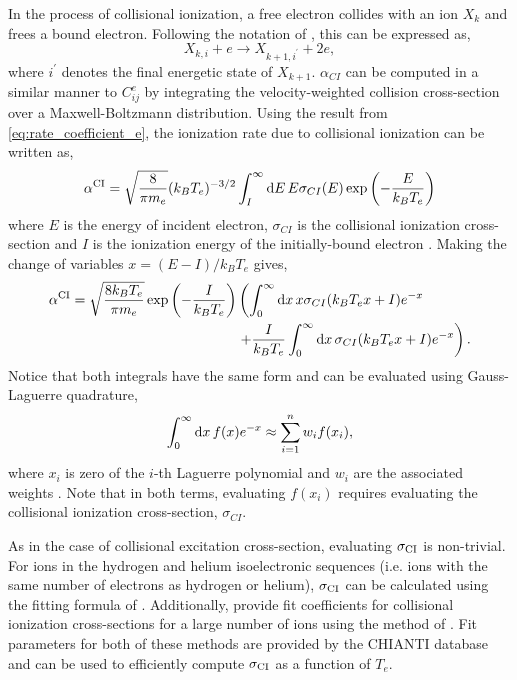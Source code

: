 In the process of collisional ionization, a free electron collides with an ion $X_k$ and frees a bound electron. Following the notation of \citet{bradshaw_collisional_2013,mason_spectroscopic_1994}, this can be expressed as,
\begin{equation}\label{eq:collisional_ionization}
    X_{k,i} + e \to X_{k+1,i^\prime} + 2e,
\end{equation}
where $i^\prime$ denotes the final energetic state of $X_{k+1}$. $\alpha_{CI}$ can be computed in a similar manner to $C^e_{ij}$ by integrating the velocity-weighted collision cross-section over a Maxwell-Boltzmann distribution. Using the result from \autoref{eq:rate_coefficient_e}, the ionization rate due to collisional ionization can be written as,
\begin{equation}
    \alpha^\textup{CI} = \sqrt{\frac{8}{\pi m_e}}(k_BT_e)^{-3/2}\int_I^{\infty}\textup{d}E\,E\sigma_{CI}(E)\exp{\left(-\frac{E}{k_BT_e}\right)}
\end{equation}
where $E$ is the energy of incident electron, $\sigma_{CI}$ is the collisional ionization cross-section and $I$ is the ionization energy of the initially-bound electron \citep{del_zanna_solar_2018}. Making the change of variables $x=(E-I)/k_BT_e$ gives,
\begin{equation}\label{eq:collisional_ionization_x}
\begin{aligned}
    \alpha^\textup{CI} = \sqrt{\frac{8k_BT_e}{\pi m_e}}\exp{\left(-\frac{I}{k_BT_e}\right)}&\left(\int_0^{\infty}\textup{d}x\,x\sigma_{CI}(k_BT_ex+I)e^{-x} \right. \\
    &\left. + \frac{I}{k_BT_e}\int_0^{\infty}\textup{d}x\,\sigma_{CI}(k_BT_ex+I)e^{-x}\right).
\end{aligned}
\end{equation}
Notice that both integrals have the same form and can be evaluated using Gauss-Laguerre quadrature,
\begin{equation}
    \int_0^\infty\textup{d}x\,f(x)e^{-x} \approx \sum_{i=1}^n w_if(x_i),
\end{equation}
where $x_i$ is zero of the $i$-th Laguerre polynomial and $w_i$ are the associated weights \citep[see Equation 25.4.45 of][]{abramowitz_handbook_1972}. Note that in both terms, evaluating $f(x_i)$ requires evaluating the collisional ionization cross-section, $\sigma_{CI}$.

As in the case of collisional excitation cross-section, evaluating $\sigma_\textup{CI}$ is non-trivial. For ions in the hydrogen and helium isoelectronic sequences (i.e. ions with the same number of electrons as hydrogen or helium), $\sigma_\textup{CI}$ can be calculated using the fitting formula of \citet{fontes_fully_1999}. Additionally, \citet{dere_ionization_2007} provide fit coefficients for collisional ionization cross-sections for a large number of ions using the method of \citet{burgess_analysis_1992}. Fit parameters for both of these methods are provided by the CHIANTI database and can be used to efficiently compute $\sigma_\textup{CI}$ as a function of $T_e$.

